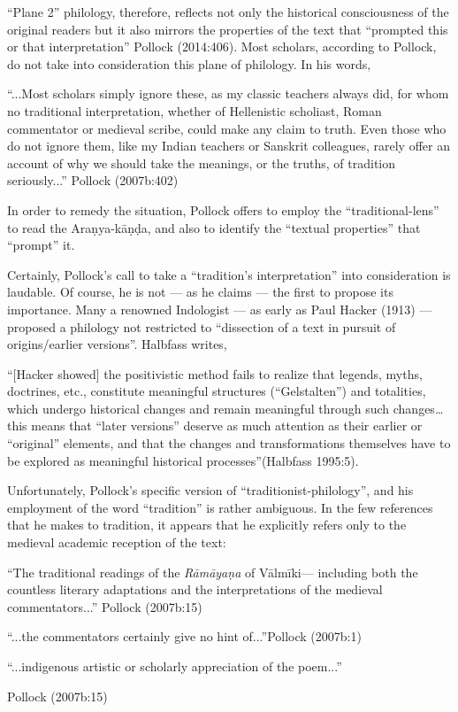 “Plane 2” philology, therefore, reflects not only the historical consciousness of the original readers but it also mirrors the properties of the text that “prompted this or that interpretation” Pollock (2014:406). Most scholars, according to Pollock, do not take into consideration this plane of philology. In his words,

\begin{myquote} 
“...Most scholars simply ignore these, as my classic teachers always did, for whom no traditional interpretation, whether of Hellenistic scholiast, Roman commentator or medieval scribe, could make any claim to truth. Even those who do not ignore them, like my Indian teachers or Sanskrit colleagues, rarely offer an account of why we should take the meanings, or the truths, of tradition seriously...”
\hfill Pollock (2007b:402)
\end{myquote}

In order to remedy the situation, Pollock offers to employ the “traditional-lens” to read the Araṇya-kāṇḍa, and also to identify the “textual properties” that “prompt” it.  
	
Certainly, Pollock’s call to take a “tradition’s interpretation” into consideration is laudable. Of course, he is not --- as he claims --- the first to propose its importance. Many a renowned Indologist --- as early as Paul Hacker (1913) --- proposed a philology not restricted to “dissection of a text in pursuit of origins/earlier versions”. Halbfass writes, 

\begin{myquote}
“[Hacker showed] the positivistic method fails to realize that legends, myths, doctrines, etc., constitute meaningful structures (“Gelstalten”) and totalities, which undergo historical changes and remain meaningful through such changes… this means that “later versions” deserve as much attention as their earlier or “original” elements, and that the changes and transformations themselves have to be explored as meaningful historical processes”\hfill (Halbfass 1995:5). 
\end{myquote}

Unfortunately, Pollock’s specific version of “traditionist-philology”, and his employment of the word “tradition” is rather ambiguous. In the few references that he makes to tradition, it appears that he explicitly refers only to the medieval academic reception of the text: 

\begin{myquote}
“The traditional readings of the {\sl Rāmāyaṇa} of Vālmīki--- including both the countless literary adaptations and the interpretations of the medieval commentators...”
\hfill	Pollock (2007b:15)

\smallskip

“...the commentators certainly give no hint of...”\hfill  Pollock (2007b:1)
	
“...indigenous artistic or scholarly appreciation of the poem...''

\hfill  Pollock (2007b:15)
\end{myquote}

